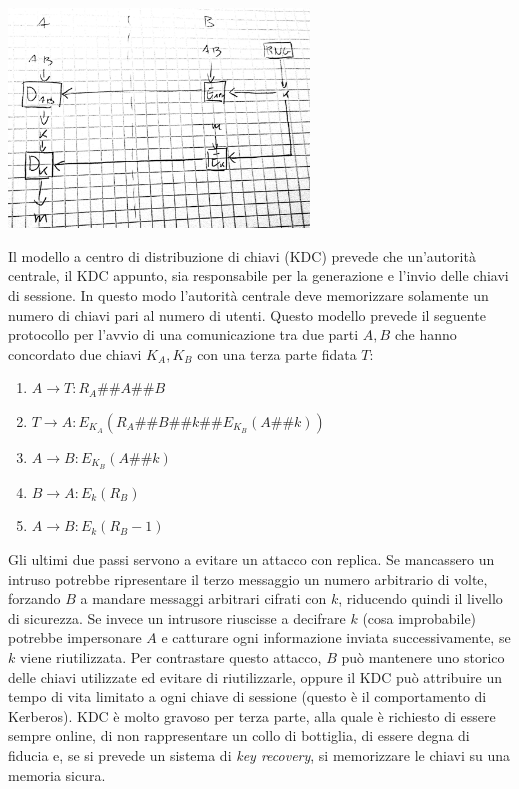 \documentclass[answers, a4paper, 11pt]{exam}
\newcommand{\concat}{\#\#}
\begin{document}
\begin{questions}
\begin{parts}
\begin{solution}
\includegraphics[width=0.6\textwidth]{masterkey}

Il modello a centro di distribuzione di chiavi (KDC) prevede che un'autorità centrale, il KDC appunto, sia responsabile per la generazione e l'invio delle chiavi di sessione.
In questo modo l'autorità centrale deve memorizzare solamente un numero di chiavi pari al numero di utenti.
Questo modello prevede il seguente protocollo per l'avvio di una comunicazione tra due parti $A, B$ che hanno concordato due chiavi $K_A, K_B$ con una terza parte fidata $T$:

	\begin{enumerate}
		\item $A \rightarrow T: R_A \concat A \concat B$
		\item $T \rightarrow A: E_{K_A}(R_A\concat B \concat k \concat E_{K_B}(A \concat k))$
		\item $A \rightarrow B: E_{K_B}(A\concat k)$
		\item $B \rightarrow A: E_k(R_B)$
		\item $A \rightarrow B: E_k(R_B - 1)$
	\end{enumerate}

Gli ultimi due passi servono a evitare un attacco con replica. 
Se mancassero un intruso potrebbe ripresentare il terzo messaggio un numero arbitrario di volte, forzando $B$ a mandare messaggi arbitrari cifrati con $k$, riducendo quindi il livello di sicurezza.
Se invece un intrusore riuscisse a decifrare $k$ (cosa improbabile) potrebbe impersonare $A$ e catturare ogni informazione inviata successivamente, se $k$ viene riutilizzata.
	Per contrastare questo attacco, $B$ può mantenere uno storico delle chiavi utilizzate ed evitare di riutilizzarle, oppure il KDC può attribuire un tempo di vita limitato a ogni chiave di sessione (questo è il comportamento di Kerberos).
	KDC è molto gravoso per  terza parte, alla quale è richiesto di essere sempre online, di non rappresentare un collo di bottiglia, di essere degna di fiducia e, se si prevede un sistema di \textit{key recovery}, si memorizzare le chiavi su una memoria sicura. 


\end{solution}
\end{parts}
\end{questions}
\end{document}
